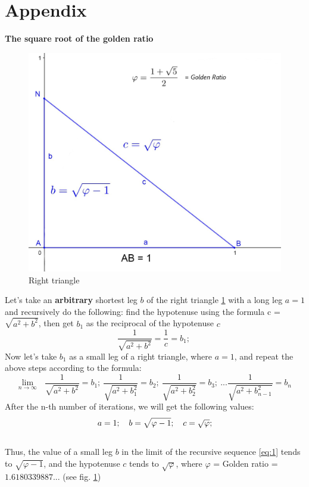 \documentclass[12pt, letterpaper, oneside]{report}
\begin{document}
\section{Appendix}
\textbf{\large The square root of the golden ratio}

\begin{figure}[h]
	\centering
	\includegraphics[width=0.7\linewidth]{images/phi-triangle.jpg}
	\caption{Right triangle}
	\label{fig:phi-triangle}
\end{figure}
\par Let's take an \textbf{arbitrary} shortest leg $b$ of the right triangle \ref{fig:phi-triangle} with a long leg $a=1$ and recursively do the following: find the hypotenuse using the formula {c }=$\sqrt{a^2+b^2}$, then get $ b_{1 }$ as the reciprocal of the hypotenuse $c$
\begin{equation}
\dfrac{1}{\sqrt{a^2+b^2}} = \dfrac{1}{c} = b_{1}; \   
\end{equation} 
Now let's take $b_{1}$ as a small leg of a right triangle, where $a=1$, and repeat the above steps according to the formula:
\begin{equation}
\lim_{n\to\infty}\ \ \ \dfrac{1}{\sqrt{a^2+b^2}} = b_{1}; \   \dfrac{1}{\sqrt{a^2+b_{1}^2}} = b_{2}; \   \dfrac{1}{\sqrt{a^2+b_{2}^2}}=b_{3}; \ ... \dfrac{1}{\sqrt{a^2+b_{n-1}^2}}=b_{n}\ \label{eq:1}
\end{equation} 
After the n-th number of iterations, we will get the following values:
\begin{equation}
a=1; \ \ \ \ 
\\
b=\sqrt{\varphi-1}; \ \ \ \ 
\\
c=\sqrt{\varphi};
\end{equation}
\\
Thus, the value of a small leg $b$ in the limit of the recursive sequence \ref{eq:1} tends to $\sqrt{\varphi-1}$, and the hypotenuse ${c}$ tends to $\sqrt{ \varphi}$, where $\varphi $ = Golden ratio = $1.6180339887...$ (see fig. \ref{fig:phi-triangle})
\\
 
\end{document}
